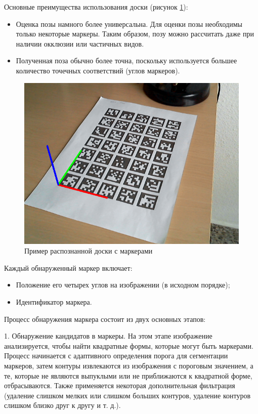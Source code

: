 Основные преимущества использования доски (рисунок \ref{fig:aruc}):
\begin{itemize}
\item Оценка позы намного более универсальна. Для оценки позы необходимы только некоторые маркеры. Таким образом, позу можно рассчитать даже при наличии окклюзии или частичных видов.
\item Полученная поза обычно более точна, поскольку используется большее количество точечных соответствий (углов маркеров).
\end{itemize}
\begin{figure}[H]
	\centering
	\includegraphics[width=0.5\linewidth]{pics/aruc}
	\caption{Пример распознанной доски с маркерами
	}
	\label{fig:aruc}
\end{figure}

Каждый обнаруженный маркер включает:
\begin{itemize}
\item Положение его четырех углов на изображении (в исходном порядке);
\item Идентификатор маркера.
\end{itemize}

Процесс обнаружения маркера состоит из двух основных этапов:

1. Обнаружение кандидатов в маркеры. На этом этапе изображение анализируется, чтобы найти квадратные формы, которые могут быть маркерами. Процесс начинается с адаптивного определения порога для сегментации маркеров, затем контуры извлекаются из изображения с пороговым значением, а те, которые не являются выпуклыми или не приближаются к квадратной форме, отбрасываются. Также применяется некоторая дополнительная фильтрация (удаление слишком мелких или слишком больших контуров, удаление контуров слишком близко друг к другу и т. д.).

